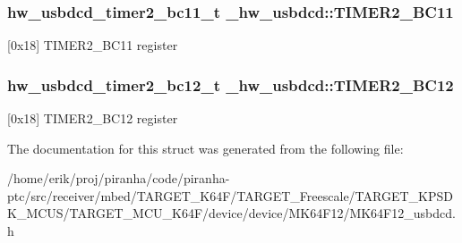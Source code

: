 \subsubsection[{\texorpdfstring{T\+I\+M\+E\+R2\+\_\+\+B\+C11}{TIMER2_BC11}}]{ {\bf hw\+\_\+usbdcd\+\_\+timer2\+\_\+bc11\+\_\+t} \+\_\+hw\+\_\+usbdcd\+::\+T\+I\+M\+E\+R2\+\_\+\+B\+C11}\hypertarget{struct__hw__usbdcd_a54053d63141dd3a056b4b70c97455871}{}\label{struct__hw__usbdcd_a54053d63141dd3a056b4b70c97455871}
\mbox{[}0x18\mbox{]} T\+I\+M\+E\+R2\+\_\+\+B\+C11 register 
\subsubsection[{\texorpdfstring{T\+I\+M\+E\+R2\+\_\+\+B\+C12}{TIMER2_BC12}}]{ {\bf hw\+\_\+usbdcd\+\_\+timer2\+\_\+bc12\+\_\+t} \+\_\+hw\+\_\+usbdcd\+::\+T\+I\+M\+E\+R2\+\_\+\+B\+C12}\hypertarget{struct__hw__usbdcd_ac27d45a3e7202a08ea04c42126f4c20c}{}\label{struct__hw__usbdcd_ac27d45a3e7202a08ea04c42126f4c20c}
\mbox{[}0x18\mbox{]} T\+I\+M\+E\+R2\+\_\+\+B\+C12 register 

The documentation for this struct was generated from the following file\+:\begin{DoxyCompactItemize}
\item 
/home/erik/proj/piranha/code/piranha-\/ptc/src/receiver/mbed/\+T\+A\+R\+G\+E\+T\+\_\+\+K64\+F/\+T\+A\+R\+G\+E\+T\+\_\+\+Freescale/\+T\+A\+R\+G\+E\+T\+\_\+\+K\+P\+S\+D\+K\+\_\+\+M\+C\+U\+S/\+T\+A\+R\+G\+E\+T\+\_\+\+M\+C\+U\+\_\+\+K64\+F/device/device/\+M\+K64\+F12/M\+K64\+F12\+\_\+usbdcd.\+h\end{DoxyCompactItemize}
